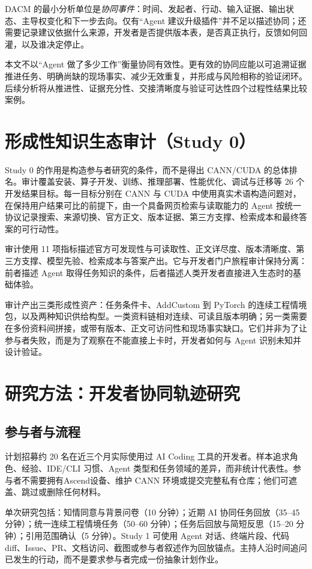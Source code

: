 \documentclass[manuscript,review,anonymous]{acmart}
\begin{document}
DACM 的最小分析单位是\emph{协同事件}：时间、发起者、行动、输入证据、输出状态、主导权变化和下一步去向。仅有“Agent 建议升级插件”并不足以描述协同；还需要记录建议依据什么来源，开发者是否提供版本表，是否真正执行，反馈如何回灌，以及谁决定停止。

本文不以“Agent 做了多少工作”衡量协同有效性。更有效的协同应能以可追溯证据推进任务、明确尚缺的现场事实、减少无效重复，并形成与风险相称的验证闭环。后续分析将从推进性、证据充分性、交接清晰度与验证可达性四个过程性结果比较案例。

\section{形成性知识生态审计（Study 0）}

Study 0 的作用是构造参与者研究的条件，而不是得出 CANN/CUDA 的总体排名。审计覆盖安装、算子开发、训练、推理部署、性能优化、调试与迁移等 26 个开发结果目标。每一目标分别在 CANN 与 CUDA 中使用真实术语构造问题对，在保持用户结果可比的前提下，由一个具备网页检索与读取能力的 Agent 按统一协议记录搜索、来源切换、官方正文、版本证据、第三方支撑、检索成本和最终答案的可行动性。

审计使用 11 项指标描述官方可发现性与可读取性、正文详尽度、版本清晰度、第三方支撑、模型先验、检索成本与答案产出。它与开发者门户旅程审计保持分离：前者描述 Agent 取得任务知识的条件，后者描述人类开发者直接进入生态时的基础体验。

审计产出三类形成性资产：任务条件卡、AddCustom 到 PyTorch 的连续工程情境包，以及两种知识供给构型。一类资料链相对连续、可读且版本明确；另一类需要在多份资料间拼接，或带有版本、正文可访问性和现场事实缺口。它们并非为了让参与者失败，而是为了观察在不能直接上卡时，开发者如何与 Agent 识别未知并设计验证。

\section{研究方法：开发者协同轨迹研究}

\subsection{参与者与流程}

计划招募约 20 名在近三个月实际使用过 AI Coding 工具的开发者。样本追求角色、经验、IDE/CLI 习惯、Agent 类型和任务领域的差异，而非统计代表性。参与者不需要拥有Ascend设备、维护 CANN 环境或提交完整私有仓库；他们可遮盖、跳过或删除任何材料。

单次研究包括：知情同意与背景问卷（10 分钟）；近期 AI 协同任务回放（35--45 分钟）；统一连续工程情境任务（50--60 分钟）；任务后回放与简短反思（15--20 分钟）；引用范围确认（5 分钟）。Study 1 可使用 Agent 对话、终端片段、代码 diff、Issue、PR、文档访问、截图或参与者叙述作为回放锚点。主持人沿时间追问已发生的行动，而不是要求参与者完成一份抽象计划作业。
\end{document}
